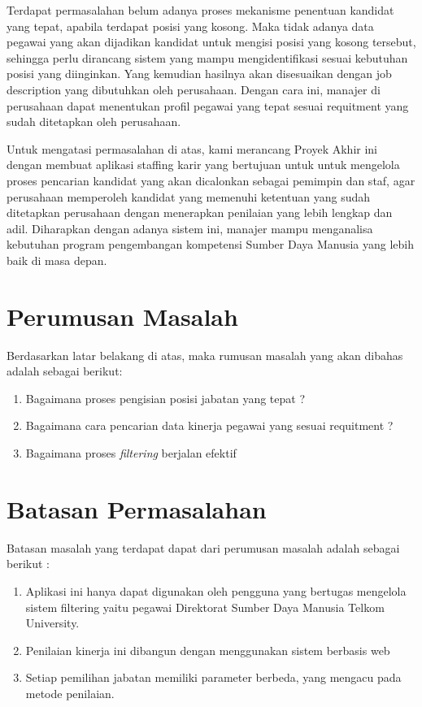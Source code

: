Terdapat permasalahan belum adanya proses mekanisme penentuan kandidat yang tepat, apabila terdapat posisi yang kosong. Maka tidak adanya data pegawai yang akan dijadikan kandidat untuk mengisi posisi yang kosong tersebut, sehingga perlu dirancang sistem yang mampu mengidentifikasi sesuai kebutuhan posisi yang diinginkan. Yang kemudian hasilnya akan disesuaikan dengan job description yang dibutuhkan oleh perusahaan. Dengan cara ini, manajer di perusahaan dapat menentukan profil pegawai yang tepat sesuai requitment yang sudah ditetapkan oleh perusahaan.

Untuk mengatasi permasalahan di atas, kami merancang Proyek Akhir ini dengan membuat aplikasi staffing karir yang bertujuan untuk untuk mengelola proses pencarian kandidat yang akan dicalonkan sebagai pemimpin dan staf, agar perusahaan memperoleh kandidat yang memenuhi ketentuan yang sudah ditetapkan perusahaan dengan menerapkan penilaian yang lebih lengkap dan adil. Diharapkan dengan adanya sistem ini, manajer mampu menganalisa kebutuhan program pengembangan kompetensi Sumber Daya Manusia yang lebih baik di masa depan.


\section{Perumusan Masalah}
Berdasarkan latar belakang di atas, maka rumusan masalah yang akan dibahas adalah sebagai berikut:
\begin{enumerate}
\item Bagaimana proses pengisian posisi jabatan yang tepat ?
\item Bagaimana cara pencarian data kinerja pegawai yang sesuai requitment ?
\item Bagaimana proses \textit{filtering} berjalan efektif
\end{enumerate}

\section{Batasan Permasalahan}
Batasan masalah yang terdapat dapat dari perumusan masalah adalah sebagai berikut :

\begin{enumerate}
	\item Aplikasi ini hanya dapat digunakan oleh pengguna yang bertugas   mengelola sistem filtering yaitu pegawai Direktorat Sumber Daya Manusia Telkom University.
	\item Penilaian kinerja ini dibangun dengan menggunakan sistem berbasis web
	\item Setiap pemilihan jabatan memiliki parameter berbeda, yang mengacu pada metode penilaian.
\end{enumerate}

